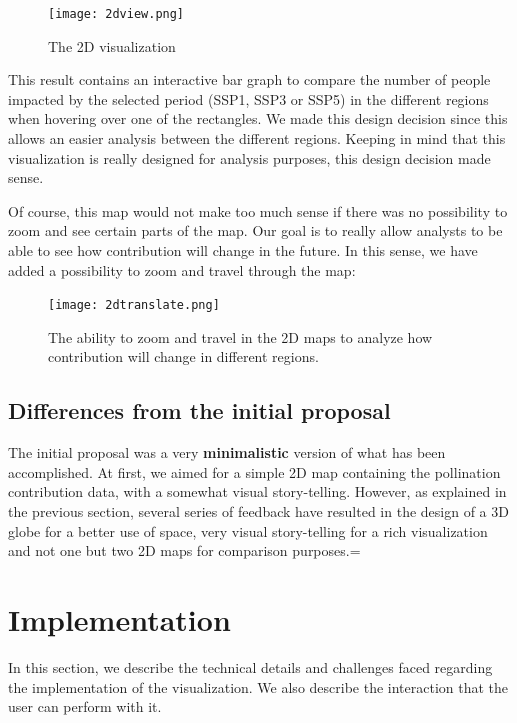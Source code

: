 \documentclass[12pt]{article}
\begin{document}
\begin{figure}[!ht]
\centering
\texttt{[image: 2dview.png]}
\caption{The 2D visualization}
\end{figure} 
This result contains an interactive bar graph to compare the number of people impacted by the selected period (SSP1, SSP3 or SSP5) in the different regions when hovering over one of the rectangles. We made this design decision since this allows an easier analysis between the different regions. Keeping in mind that this visualization is really designed for analysis purposes, this design decision made sense. \newline

Of course, this map would not make too much sense if there was no possibility to zoom and see certain parts of the map. Our goal is to really allow analysts to be able to see how contribution will change in the future. In this sense, we have added a possibility to zoom and travel through the map: 
\begin{figure}[!ht]
\centering
\texttt{[image: 2dtranslate.png]}
\caption{The ability to zoom and travel in the 2D maps to analyze how contribution will change in different regions.}
\end{figure} \newline
\subsection{Differences from the initial proposal}
The initial proposal was a very \textbf{minimalistic} version of what has been accomplished. At first, we aimed for a simple 2D map containing the pollination contribution data, with a somewhat visual story-telling. However, as explained in the previous section, several series of feedback have resulted in the design of a 3D globe for a better use of space, very visual story-telling for a rich visualization and not one but two 2D maps for comparison purposes.=

\section{Implementation}
In this section, we describe the technical details and challenges faced regarding the implementation of the visualization. We also describe the interaction that the user can perform with it.
\end{document}
